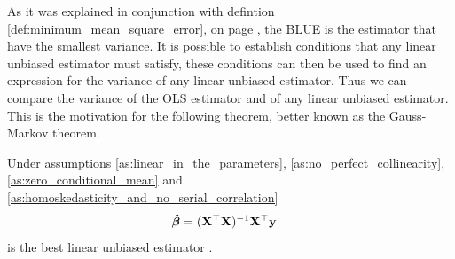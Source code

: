 As it was explained in conjunction with defintion \ref{def:minimum_mean_square_error}, on page \pageref{def:minimum_mean_square_error}, the BLUE is the estimator that have the smallest variance.
It is possible to establish conditions that any linear unbiased estimator must satisfy, these conditions can then be used to find an expression for the variance of any linear unbiased estimator.
Thus we can compare the variance of the OLS estimator and of any linear unbiased estimator.
This is the motivation for the following theorem, better known as the Gauss-Markov theorem.
\begin{theorem}
    Under assumptions \ref{as:linear_in_the_parameters}, \ref{as:no_perfect_collinearity}, \ref{as:zero_conditional_mean} and \ref{as:homoskedasticity_and_no_serial_correlation} 
    \begin{align*}
        \operatorname{\boldsymbol{\hat{\beta}}} &= (\mathbf{X}^\top\mathbf{X})^{-1}\mathbf{X}^\top\mathbf{y}
    \end{align*}
    is the best linear unbiased estimator \cite[p. 811]{Wooldridge2012}.
\end{theorem}\label{th:gauss_markoc_theorem}
